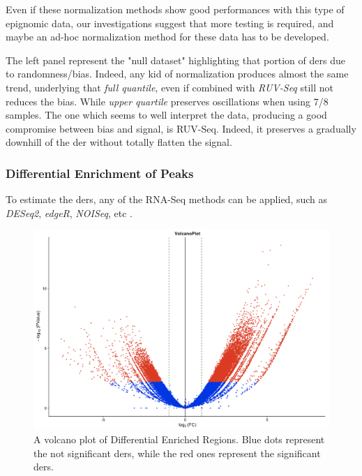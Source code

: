 Even if these normalization methods show good performances with this type of epignomic data, our investigations suggest that more testing is required, and maybe an ad-hoc normalization method for these data has to be developed.

The left panel represent the "null dataset" highlighting that portion of \glspl{der} due to randomness/bias. Indeed, any kid of normalization produces almost the same trend, underlying that \textit{full quantile}, even if combined with \textit{RUV-Seq} still not reduces the bias.
While \textit{upper quartile} preserves oscillations when using 7/8 samples.
The one which seems to well interpret the data, producing a good compromise between bias and signal, is RUV-Seq.
Indeed, it preserves a gradually downhill of the \gls{der} without totally flatten the signal.

\subsubsection{Differential Enrichment of Peaks}

To estimate the \glspl{der}, any of the RNA-Seq methods can be applied, such as \textit{DESeq2}, \textit{edgeR}, \textit{NOISeq}, etc \cite{Robinson2009, McCarthy2012, Tarazona2012}.

\begin{figure}[H]
\centering
\includegraphics[width=\textwidth, keepaspectratio]{img/descan2/DE_peaks.png}
\caption[Differential Enrichment Regions Volcano]{A volcano plot of Differential Enriched Regions. Blue dots represent the not significant \glspl{der}, while the red ones represent the significant \glspl{der}.}
\label{fig:depeaksdescan}
\centering
\end{figure}

